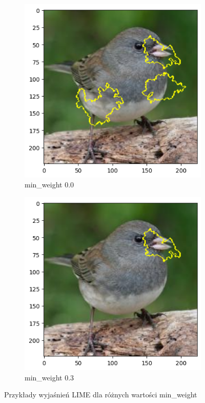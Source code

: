 \begin{figure}[h]
	\centering
	\begin{subfigure}[b]{0.3\textwidth}
		\includegraphics[width=.9\textwidth]{img/parameters/lime/min_weight_00}
		\caption{min\_weight 0.0}  \label{rys:parameters_lime_numsamples_5}
	\end{subfigure}
	\begin{subfigure}[b]{0.3\textwidth}
		\centering\includegraphics[width=.9\textwidth]{img/parameters/lime/min_weight_03}
		\caption{min\_weight 0.3}  \label{rys:parameters_lime_numsamples_1000}
	\end{subfigure}
	\caption{Przykłady wyjaśnień LIME dla różnych wartości min\_weight}
\end{figure}


